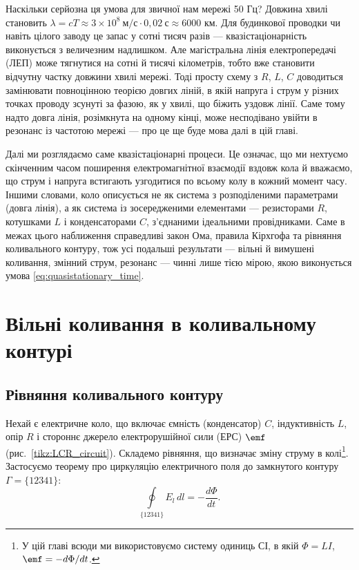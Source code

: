 \begin{Attention}
	Наскільки серйозна ця умова для звичної нам мережі 50 Гц? Довжина хвилі становить $\lambda = cT \approx 3\times10^{8}\ \text{м/с}\cdot 0{,}02\ \text{с} \approx 6000$ км. Для будинкової проводки чи навіть цілого заводу це запас у сотні тисяч разів --- квазістаціонарність виконується з величезним надлишком. Але магістральна лінія електропередачі (ЛЕП) може тягнутися на сотні й тисячі кілометрів, тобто вже становити відчутну частку довжини хвилі мережі. Тоді просту схему з $R$, $L$, $C$ доводиться замінювати повноцінною теорією довгих ліній, в якій напруга і струм у різних точках проводу зсунуті за фазою, як у хвилі, що біжить уздовж лінії. Саме тому надто довга лінія, розімкнута на одному кінці, може несподівано увійти в резонанс із частотою мережі --- про це ще буде мова далі в цій главі.
\end{Attention}

Далі ми розглядаємо саме квазістаціонарні процеси. Це означає, що ми нехтуємо скінченним часом поширення електромагнітної взаємодії вздовж кола й вважаємо, що струм і напруга встигають узгодитися по всьому колу в кожний момент часу. Іншими словами, коло описується не як система з розподіленими параметрами (довга лінія), а як система із зосередженими елементами --- резисторами $R$, котушками $L$ і конденсаторами $C$, з'єднаними ідеальними провідниками. Саме в межах цього наближення справедливі закон Ома, правила Кірхгофа та рівняння коливального контуру, тож усі подальші результати --- вільні й вимушені коливання, змінний струм, резонанс --- чинні лише тією мірою, якою виконується умова \eqref{eq:quasistationary_time}.

\section{Вільні коливання в коливальному контурі}

\subsection*{Рівняння коливального контуру}

Нехай є електричне коло, що включає ємність (конденсатор) $C$, індуктивність $L$, опір $R$ і стороннє джерело електрорушійної сили (ЕРС) $\emf$ (рис.~\ref{tikz:LCR_circuit}). Складемо рівняння, що визначає зміну струму в колі\footnote{У цій главі всюди ми використовуємо систему одиниць СІ, в якій $\Phi = LI$, $\emf = -d\Phi/dt$.}. Застосуємо теорему про циркуляцію електричного поля до замкнутого контуру $\Gamma = \{12341\}$:
\begin{equation}\label{eq:circulation}
	\oint\limits_{\{12341\}} E_l \, dl = -\frac{d\Phi}{dt}.
\end{equation}

